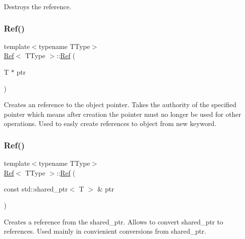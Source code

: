 Destroys the reference. 

\mbox{\label{class_ref_a235b1cec9594a29c7d4c6b58e92bc602}} 
\subsubsection{\texorpdfstring{Ref()}{Ref()}\hspace{0.1cm}{\footnotesize\ttfamily [2/6]}}
{\footnotesize\ttfamily template$<$typename T\+Type$>$ \\
\mbox{\hyperlink{class_ref}{Ref}}$<$ T\+Type $>$\+::\mbox{\hyperlink{class_ref}{Ref}} (\begin{DoxyParamCaption}\item[{T $\ast$}]{ptr }\end{DoxyParamCaption})\hspace{0.3cm}{\ttfamily [inline]}}



Creates an reference to the object pointer. Takes the authority of the specified pointer which means after creation the pointer must no longer be used for other operations. Used to easly create references to object from new keyword. 

\mbox{\label{class_ref_ace2c482df7f5bc1b71cf36e962f0fd0a}} 
\subsubsection{\texorpdfstring{Ref()}{Ref()}\hspace{0.1cm}{\footnotesize\ttfamily [3/6]}}
{\footnotesize\ttfamily template$<$typename T\+Type$>$ \\
\mbox{\hyperlink{class_ref}{Ref}}$<$ T\+Type $>$\+::\mbox{\hyperlink{class_ref}{Ref}} (\begin{DoxyParamCaption}\item[{const std\+::shared\+\_\+ptr$<$ T $>$ \&}]{ptr }\end{DoxyParamCaption})\hspace{0.3cm}{\ttfamily [inline]}}



Creates a reference from the shared\+\_\+ptr. Allows to convert shared\+\_\+ptr to references. Used mainly in convienient conversions from shared\+\_\+ptr. 

